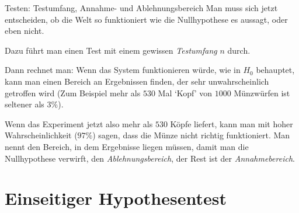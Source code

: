 \begin{bla}
{Testen: Testumfang, Annahme- und Ablehnungsbereich}
  Man muss sich jetzt entscheiden, ob die Welt so funktioniert wie die Nullhypothese es aussagt, oder eben nicht.

  Dazu führt man einen Test mit einem gewissen \emph{Testumfang} $n$ durch.

  Dann rechnet man: Wenn das System funktionieren würde, wie in $H_0$ behauptet, kann man einen Bereich an Ergebnissen finden, der sehr unwahrscheinlich getroffen wird (Zum Beispiel mehr als \( 530 \) Mal `Kopf' von \( 1000 \) Münzwürfen ist seltener als \( 3 \% \)).

  Wenn das Experiment jetzt also mehr als \( 530 \) Köpfe liefert, kann man mit hoher Wahrscheinlichkeit (\( 97 \% \)) sagen, dass die Münze nicht richtig funktioniert.
  Man nennt den Bereich, in dem Ergebnisse liegen müssen, damit man die Nullhypothese verwirft, den \emph{Ablehnungsbereich}, der Rest ist der \emph{Annahmebereich}.
\end{bla}

\section{Einseitiger Hypothesentest}

